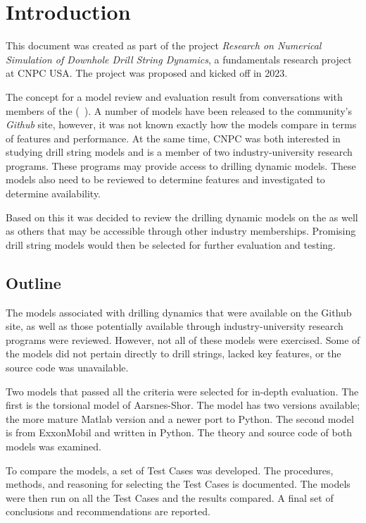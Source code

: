 \chapter{Introduction}
This document was created as part of the project \emph{Research on Numerical Simulation of Downhole Drill String Dynamics}, a fundamentals research project at CNPC USA.  The project was proposed and kicked off in 2023.

The concept for a model review and evaluation result from conversations with members of the \osdc{} (~\cite{ref:pastusek2019a}).  A number of models have been released to the community's \emph{Github} site, however, it was not known exactly how the models compare in terms of features and performance.  At the same time, CNPC was both interested in studying drill string models and is a member of two industry-university research programs.  These programs may provide access to drilling dynamic models.  These models also need to be reviewed to determine features and investigated to determine availability.

Based on this it was decided to review the drilling dynamic models on the \osdc{} as well as others that may be accessible through other industry memberships.  Promising drill string models would then be selected for further evaluation and testing.

\section{Outline}
The models associated with drilling dynamics that were available on the \osdc{} Github site, as well as those potentially available through industry-university research programs were reviewed.  However, not all of these models were exercised.  Some of the models did not pertain directly to drill strings, lacked key features, or the source code was unavailable.

Two models that passed all the criteria were selected for in-depth evaluation.  The first is the torsional model of Aarsnes-Shor.  The model has two versions available; the more mature Matlab version and a newer port to Python.  The second model is from ExxonMobil and written in Python.  The theory and source code of both models was examined.

To compare the models, a set of Test Cases was developed.  The procedures, methods, and reasoning for selecting the Test Cases is documented.  The models were then run on all the Test Cases and the results compared.  A final set of conclusions and recommendations are reported.

